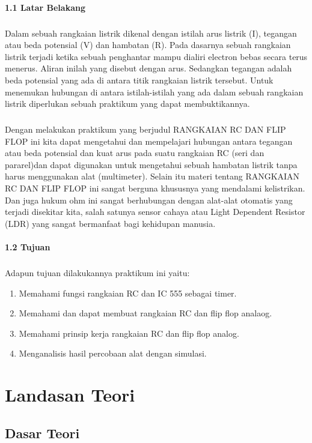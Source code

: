 \documentclass[12pt,a4paper]{article}
\begin{document}
\paragraph{1.1 Latar Belakang}
\subparagraph{ }
	Dalam sebuah rangkaian listrik dikenal dengan istilah arus listrik (I), tegangan atau beda potensial (V) dan hambatan (R). Pada dasarnya sebuah rangkaian listrik terjadi ketika sebuah penghantar mampu dialiri electron bebas secara terus menerus. Aliran inilah yang disebut dengan arus. Sedangkan tegangan adalah beda potensial yang ada di antara titik rangkaian listrik tersebut. Untuk menemukan hubungan di antara istilah-istilah yang ada dalam sebuah rangkaian listrik diperlukan sebuah praktikum yang dapat membuktikannya.
\subparagraph{ }
	Dengan melakukan praktikum yang berjudul RANGKAIAN RC DAN FLIP FLOP ini kita dapat mengetahui dan mempelajari hubungan antara tegangan atau beda potensial dan kuat arus pada suatu rangkaian RC (seri dan pararel)dan dapat digunakan untuk mengetahui sebuah hambatan listrik tanpa harus menggunakan alat (multimeter). Selain itu materi tentang RANGKAIAN RC DAN FLIP FLOP ini sangat berguna khususnya yang mendalami kelistrikan. Dan juga hukum ohm ini sangat berhubungan dengan alat-alat otomatis yang terjadi disekitar kita, salah satunya sensor cahaya atau Light Dependent Resistor (LDR) yang sangat bermanfaat bagi kehidupan manusia.
 
 

\paragraph{1.2 Tujuan}
\subparagraph{ }
Adapun tujuan dilakukannya praktikum ini yaitu:
\begin{enumerate}
\item Memahami fungsi rangkaian RC dan IC 555 sebagai timer.
\item Memahami dan dapat membuat rangkaian RC dan flip flop analaog.
\item Memahami prinsip kerja rangkaian RC dan flip flop analog.
\item Menganalisis hasil percobaan alat dengan simulasi.
\end{enumerate}


\newpage
\section{Landasan Teori}
\subsection{Dasar Teori}
\end{document}
